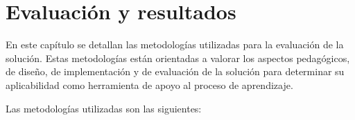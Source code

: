 
\chapter{Evaluación y resultados}
\label{chap:evaluacion}


En este capítulo se detallan las metodologías utilizadas para la evaluación de la 
solución. Estas metodologías están orientadas a valorar los 
aspectos pedagógicos, de diseño, de implementación y de evaluación de la solución 
para determinar su aplicabilidad como herramienta de apoyo al proceso de 
aprendizaje.

%

Las metodologías utilizadas son las siguientes:

